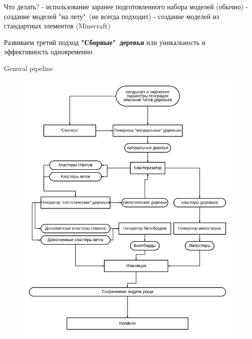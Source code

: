 \documentclass[11pt]{beamer}
\begin{document}
\begin{frame}{Что делать?}
- использование заранее подготовленного набора моделей (обычно)\linebreak
- создание моделей "на лету"\ (не всегда подходит)\linebreak
- создание моделей из стандартных элементов (Minecraft)\linebreak
\end{frame}
\begin{frame}{Развиваем третий подход}
\textbf{"Сборные"\ деревья}\linebreak
или\linebreak
уникальность и эффективность одновременно
\end{frame}
\begin{frame}{General pipeline}
\begin{figure}[hbtp]
\centering
\includegraphics[scale=0.25]{diagram.png}
\end{figure}
\end{frame}
\end{document}
